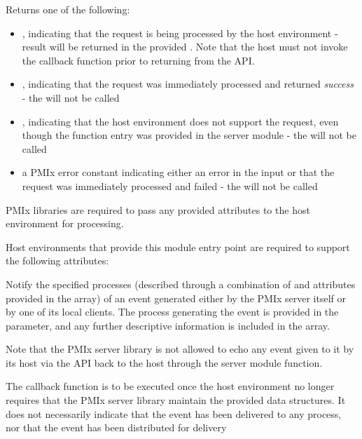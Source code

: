 Returns one of the following:

\begin{itemize}
    \item {}, indicating that the request is being processed by the host environment - result will be returned in the provided . Note that the host must not invoke the callback function prior to returning from the \ac{API}.
    \item {}, indicating that the request was immediately processed and returned \textit{success} - the  will not be called
    \item {}, indicating that the host environment does not support the request, even though the function entry was provided in the server module - the  will not be called
    \item a PMIx error constant indicating either an error in the input or that the request was immediately processed and failed - the  will not be called
\end{itemize}

\reqattrstart
\ac{PMIx} libraries are required to pass any provided attributes to the host environment for processing.

Host environments that provide this module entry point are required to support the following attributes:


\reqattrend

\descr

Notify the specified processes (described through a combination of  and attributes provided in the  array) of an event generated either by the \ac{PMIx} server itself or by one of its local clients.
The process generating the event is provided in the  parameter, and any further descriptive information is
included in the  array.

Note that the \ac{PMIx} server library is not allowed to echo any event given to it by its host via the  \ac{API} back to the host through the  server module function.

\advicermstart
The callback function is to be executed once the host environment no longer requires that the \ac{PMIx} server library maintain the provided data structures. It does not necessarily indicate that the event has been delivered to any process, nor that the event has been distributed for delivery
\advicermend


